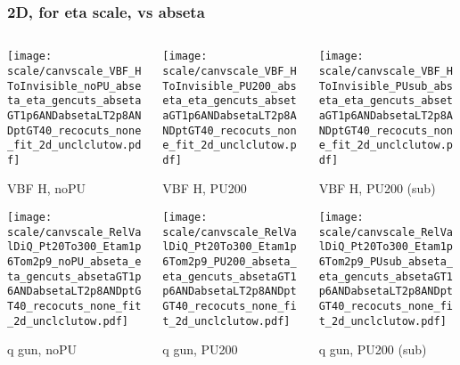 \documentclass[8pt]{beamer}
\begin{document}
   \begin{frame}
  \frametitle{2D, for eta scale, vs abseta}
  
  \begin{columns}
   \begin{column}{0.35\textwidth}
     \texttt{[image: scale/canvscale\_VBF\_HToInvisible\_noPU\_abseta\_eta\_gencuts\_absetaGT1p6ANDabsetaLT2p8ANDptGT40\_recocuts\_none\_fit\_2d\_unclclutow.pdf]}
     
     VBF H, noPU
    
     \texttt{[image: scale/canvscale\_RelValDiQ\_Pt20To300\_Etam1p6Tom2p9\_noPU\_abseta\_eta\_gencuts\_absetaGT1p6ANDabsetaLT2p8ANDptGT40\_recocuts\_none\_fit\_2d\_unclclutow.pdf]}
     
     q gun, noPU
   \end{column}
   \begin{column}{0.35\textwidth}
     \texttt{[image: scale/canvscale\_VBF\_HToInvisible\_PU200\_abseta\_eta\_gencuts\_absetaGT1p6ANDabsetaLT2p8ANDptGT40\_recocuts\_none\_fit\_2d\_unclclutow.pdf]}
     
     VBF H, PU200
    
     \texttt{[image: scale/canvscale\_RelValDiQ\_Pt20To300\_Etam1p6Tom2p9\_PU200\_abseta\_eta\_gencuts\_absetaGT1p6ANDabsetaLT2p8ANDptGT40\_recocuts\_none\_fit\_2d\_unclclutow.pdf]}
     
     q gun, PU200
   \end{column}
   \begin{column}{0.35\textwidth}
     \texttt{[image: scale/canvscale\_VBF\_HToInvisible\_PUsub\_abseta\_eta\_gencuts\_absetaGT1p6ANDabsetaLT2p8ANDptGT40\_recocuts\_none\_fit\_2d\_unclclutow.pdf]}
     
     VBF H, PU200 (sub)
    
     \texttt{[image: scale/canvscale\_RelValDiQ\_Pt20To300\_Etam1p6Tom2p9\_PUsub\_abseta\_eta\_gencuts\_absetaGT1p6ANDabsetaLT2p8ANDptGT40\_recocuts\_none\_fit\_2d\_unclclutow.pdf]}
     
     q gun, PU200 (sub)
   \end{column}
  \end{columns}
 \end{frame}
 
\end{document}

